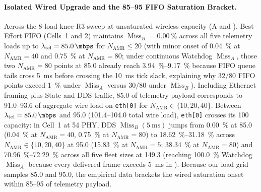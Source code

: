 \documentclass[11pt,a4paper]{article}
\newcommand{\Namr}{\ensuremath{N_{\mathrm{AMR}}}}
\newcommand{\ltel}{\ensuremath{\lambda_{\mathrm{tel}}}}
\newcommand{\MissA}{\ensuremath{\operatorname{Miss}_A}}
\newcommand{\MissB}{\ensuremath{\operatorname{Miss}_B}}
\begin{document}
\paragraph{Isolated Wired Upgrade and the \qtyrange{85}{95}{\mbps} FIFO Saturation Bracket.}
Across the 8-load knee-R3 sweep at unsaturated wireless capacity (A and ), Best-Effort FIFO (Cells~1 and 2) maintains $\MissB = \qty{0.00}{\percent}$ across all five telemetry loads up to $\ltel = \qty{85.0}{\mbps}$ for $\Namr \le 20$ (with minor onset of \qty{0.04}{\percent} at $\Namr=40$ and \qty{0.75}{\percent} at $\Namr=80$; under continuous Watchdog $\MissA$, those two $\Namr=80$ points at \qty{85.0}{\mbps} already reach \qtyrange{3.94}{9.17}{\percent} because FIFO queue tails cross \qty{5}{\milli\second} before crossing the \qty{10}{\milli\second} tick slack, explaining why $32/80$ FIFO points exceed \qty{1}{\percent} under $\MissA$ versus $30/80$ under $\MissB$). Including Ethernet framing plus State and DDS traffic, \qty{85.0}{\mbps} of telemetry payload corresponds to \qtyrange{91.0}{93.6}{\mbps} of aggregate wire load on \texttt{eth[0]} for $\Namr \in \{10, 20, 40\}$. Between $\ltel = \qty{85.0}{\mbps}$ and \qty{95.0}{\mbps} (\qtyrange{101.4}{104.0}{\mbps} total wire load), \texttt{eth[0]} crosses its \qty{100}{\mbps} capacity: in Cell~1 at \qty{54}{\mbps} PHY, DDS $\MissB(\qty{5}{\milli\second})$ jumps from \qty{0.00}{\percent} at \qty{85.0}{\mbps} (\qty{0.04}{\percent} at $\Namr=40$, \qty{0.75}{\percent} at $\Namr=80$) to \qtyrange{18.62}{31.18}{\percent} across $\Namr \in \{10,20,40\}$ at \qty{95.0}{\mbps} (\qty{15.83}{\percent} at $\Namr=5$; \qty{38.34}{\percent} at $\Namr=80$) and \qtyrange{70.96}{72.29}{\percent} across all five fleet sizes at \qty{149.3}{\mbps} (reaching \qty{100.0}{\percent} Watchdog $\MissA$ because every delivered frame exceeds \qty{5}{\milli\second} in ). Because our load grid samples \qty{85.0}{\mbps} and \qty{95.0}{\mbps}, the empirical data brackets the wired saturation onset within \qtyrange{85}{95}{\mbps} of telemetry payload.
\end{document}
